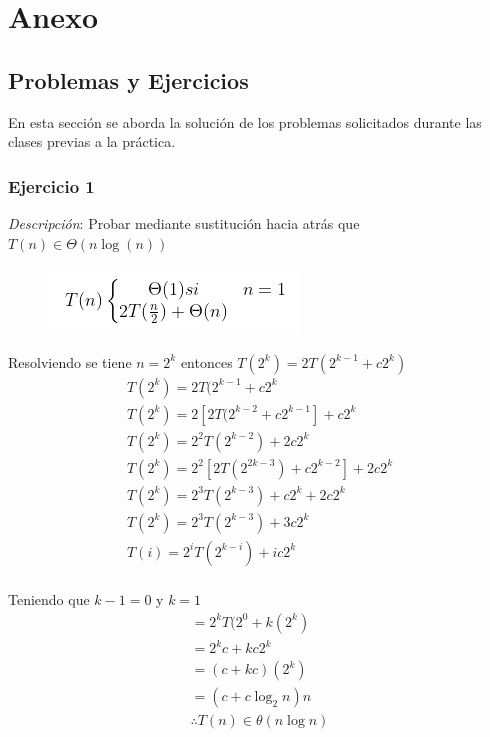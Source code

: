 \chapter{Anexo}

    \section{Problemas y Ejercicios}
        En esta sección se aborda la solución de los problemas solicitados durante las clases previas a la práctica. 

        \subsection{Ejercicio 1}
            \textit{Descripción}: Probar mediante sustitución hacia atrás que \(T(n) \in \Theta (n\log(n) ) \)
            
                \begin{figure}[htp!]
                    \centering
                    \includegraphics[width=0.3 \textwidth]{Images/eee.png}
                    \label{fig:1}
                \end{figure}
            Resolviendo se tiene \(n = 2^{k}\) entonces \(T(2^{k}) = 2T(2^{k-1}+c2^{k})\)
                \begin{gather*}
                    T(2^{k})=2T(2^{k-1}+c2^{k}\\
                    T(2^{k})=2[2T(2^{k-2}+c2^{k-1}] + c2^{k}\\
                    T(2^{k})=2^{2}T(2^{k-2}) + 2c2^{k}\\
                    T(2^{k})=2^{2}[2T(2^{2k-3}) + c2^{k-2}] + 2c2^{k}\\
                    T(2^{k})=2^{3}T(2^{k-3}) + c2^{k} + 2c2^{k}\\
                    T(2^{k})=2^{3}T(2^{k-3}) + 3c2^{k}\\
                    T(i)=2^{i}T(2^{k-i}) + ic2^{k}\\
                \end{gather*}
            
            Teniendo que \(k-1 = 0\) y \(k = 1\)
                \begin{gather*}
                    = 2^{k}T(2^{0}+k(2^{k})\\
                    = 2^{k}c+kc2^{k}\\
                    = (c + kc)(2^{k})\\
                    = (c + c\log_{2}n)n\\
                    \therefore T(n)\in \theta (n\log{n})
                \end{gather*}

